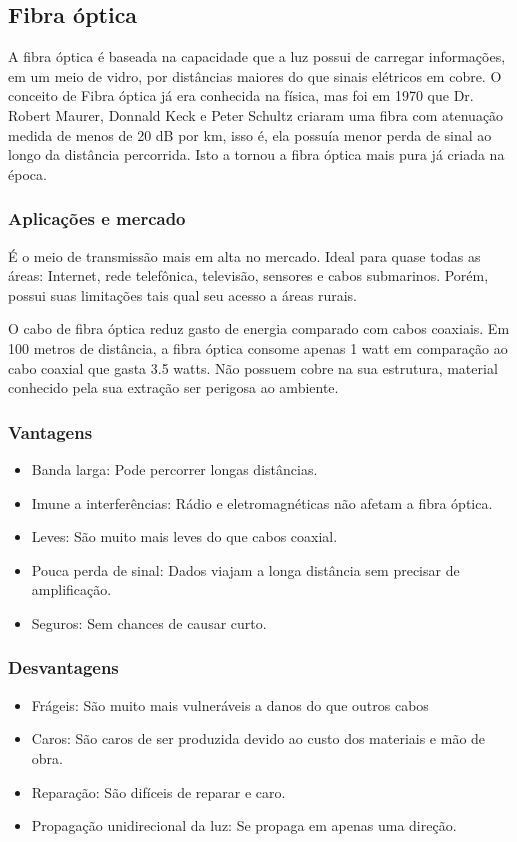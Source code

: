 \documentclass[12pt,a4, oneside, brazil]{article}
\begin{document}
	\subsection{Fibra óptica}
	A fibra óptica é baseada na capacidade que a luz possui de carregar informações, em um meio de vidro, por distâncias maiores do que sinais elétricos em cobre. O conceito de Fibra óptica já era conhecida na física, mas foi em 1970 que Dr. Robert Maurer, Donnald Keck e Peter Schultz criaram uma fibra com atenuação medida de menos de 20 dB por km, isso é,  ela possuía menor perda de sinal ao longo da distância percorrida. Isto a tornou a fibra óptica mais pura já criada na época.
	
	\subsubsection{Aplicações e mercado}
	É o meio de transmissão mais em alta no mercado. Ideal para quase todas as áreas: Internet, rede telefônica, televisão, sensores e cabos submarinos. Porém, possui suas limitações tais qual seu acesso a áreas rurais. 
	
	O cabo de fibra óptica reduz gasto de energia comparado com cabos coaxiais. Em 100 metros de distância, a fibra óptica consome apenas 1 watt em comparação ao cabo coaxial que gasta 3.5 watts. Não possuem cobre na sua estrutura, material conhecido pela sua extração ser perigosa ao ambiente.
	
	\subsubsection{Vantagens}
	\begin{itemize}
		\item Banda larga: Pode percorrer longas distâncias.
		\item Imune a interferências: Rádio e eletromagnéticas não afetam a fibra óptica.
		\item Leves: São muito mais leves do que cabos coaxial.
		\item Pouca perda de sinal: Dados viajam a longa distância sem precisar de amplificação.
		\item Seguros: Sem chances de causar curto.
	\end{itemize}
	
	\subsubsection{Desvantagens}
	\begin{itemize}
		\item Frágeis: São muito mais vulneráveis a danos do que outros cabos
		\item Caros: São caros de ser produzida devido ao custo dos materiais e mão de obra.
		\item Reparação: São difíceis de reparar e caro.
		\item Propagação unidirecional da luz: Se propaga em apenas uma direção.
	\end{itemize}
	
\end{document}
